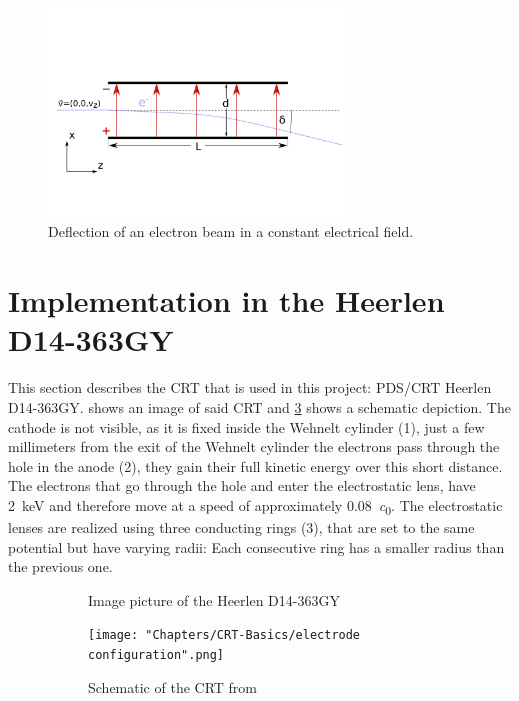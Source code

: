 \begin{figure}
	\centering
	\includegraphics[width=0.7\textwidth]{Chapters/CRT-Basics/DeflectionPlate2}
	\caption{Deflection of an electron beam in a constant electrical field.}
	\label{fig:deflectionplate2}
\end{figure}

\section{Implementation in the Heerlen D14-363GY }


This section describes the CRT that is used in this project: PDS/CRT Heerlen D14-363GY.  shows an image of said CRT and \cref{fig:SchemeCRT} shows a schematic depiction. The cathode is not visible, as it is fixed inside the Wehnelt cylinder (1), just a few millimeters from the exit of the Wehnelt cylinder the electrons pass through the hole in the anode (2), they gain their full kinetic energy over this short distance. The electrons that go through the hole and enter the electrostatic lens, have \SI{2}{\kilo\electronvolt} and therefore move at a speed of approximately \SI{0.08}{\clight}. 
The electrostatic lenses are realized using three conducting rings (3), that are set to the same potential but have varying radii: Each consecutive ring has a smaller radius than the previous one. 

\begin{figure}
	\centering
	\begin{subfigure}{.5\textwidth}
		\centering
		\caption{Image picture of the Heerlen D14-363GY}
		\label{fig:FotoCRT}
	\end{subfigure}%
	\begin{subfigure}{.5\textwidth}
		\centering
		\texttt{[image: "Chapters/CRT-Basics/electrode configuration".png]}
		\caption{Schematic of the CRT from \cite{D14363GY123-manual}}
		\label{fig:SchemeCRT}
	\end{subfigure}
	\caption{}
	\label{}
\end{figure}


